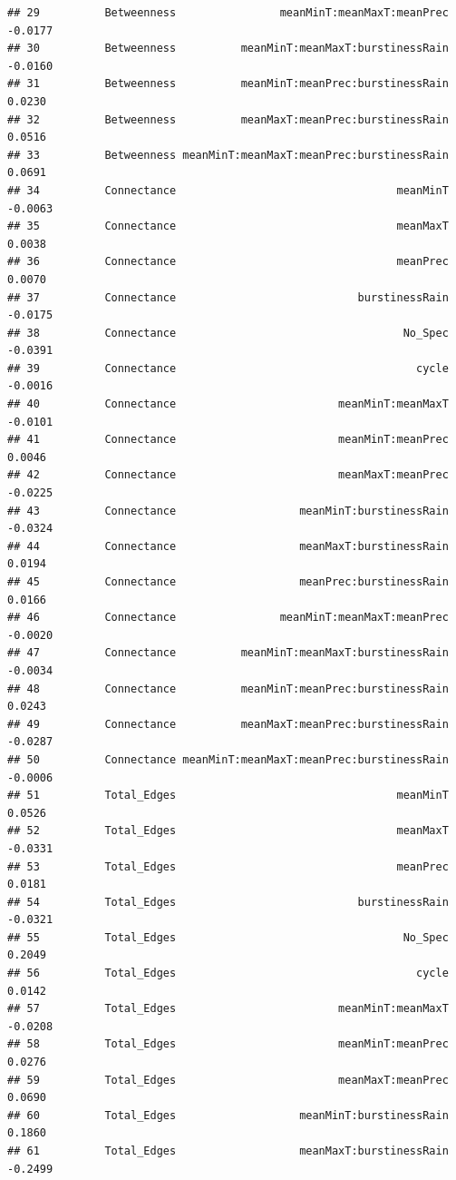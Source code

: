 \documentclass[
]{article}
\begin{document}
\begin{verbatim}
## 29          Betweenness                meanMinT:meanMaxT:meanPrec     -0.0177
## 30          Betweenness          meanMinT:meanMaxT:burstinessRain     -0.0160
## 31          Betweenness          meanMinT:meanPrec:burstinessRain      0.0230
## 32          Betweenness          meanMaxT:meanPrec:burstinessRain      0.0516
## 33          Betweenness meanMinT:meanMaxT:meanPrec:burstinessRain      0.0691
## 34          Connectance                                  meanMinT     -0.0063
## 35          Connectance                                  meanMaxT      0.0038
## 36          Connectance                                  meanPrec      0.0070
## 37          Connectance                            burstinessRain     -0.0175
## 38          Connectance                                   No_Spec     -0.0391
## 39          Connectance                                     cycle     -0.0016
## 40          Connectance                         meanMinT:meanMaxT     -0.0101
## 41          Connectance                         meanMinT:meanPrec      0.0046
## 42          Connectance                         meanMaxT:meanPrec     -0.0225
## 43          Connectance                   meanMinT:burstinessRain     -0.0324
## 44          Connectance                   meanMaxT:burstinessRain      0.0194
## 45          Connectance                   meanPrec:burstinessRain      0.0166
## 46          Connectance                meanMinT:meanMaxT:meanPrec     -0.0020
## 47          Connectance          meanMinT:meanMaxT:burstinessRain     -0.0034
## 48          Connectance          meanMinT:meanPrec:burstinessRain      0.0243
## 49          Connectance          meanMaxT:meanPrec:burstinessRain     -0.0287
## 50          Connectance meanMinT:meanMaxT:meanPrec:burstinessRain     -0.0006
## 51          Total_Edges                                  meanMinT      0.0526
## 52          Total_Edges                                  meanMaxT     -0.0331
## 53          Total_Edges                                  meanPrec      0.0181
## 54          Total_Edges                            burstinessRain     -0.0321
## 55          Total_Edges                                   No_Spec      0.2049
## 56          Total_Edges                                     cycle      0.0142
## 57          Total_Edges                         meanMinT:meanMaxT     -0.0208
## 58          Total_Edges                         meanMinT:meanPrec      0.0276
## 59          Total_Edges                         meanMaxT:meanPrec      0.0690
## 60          Total_Edges                   meanMinT:burstinessRain      0.1860
## 61          Total_Edges                   meanMaxT:burstinessRain     -0.2499

\end{verbatim}
\end{document}
